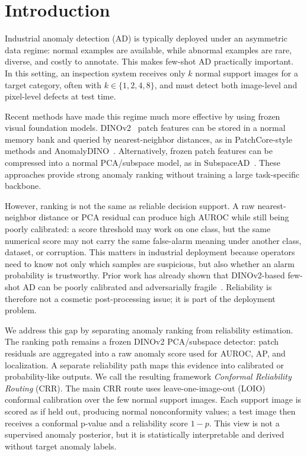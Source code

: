 \section{Introduction}\label{sec:introduction}
Industrial anomaly detection (AD) is typically deployed under an asymmetric data regime: normal examples are available, while abnormal examples are rare, diverse, and costly to annotate. This makes few-shot AD practically important. In this setting, an inspection system receives only $k$ normal support images for a target category, often with $k\in\{1,2,4,8\}$, and must detect both image-level and pixel-level defects at test time.

Recent methods have made this regime much more effective by using frozen visual foundation models. DINOv2~\cite{dinov22023} patch features can be stored in a normal memory bank and queried by nearest-neighbor distances, as in PatchCore-style methods and AnomalyDINO~\cite{patchcore2021,anomalydino2024}. Alternatively, frozen patch features can be compressed into a normal PCA/subspace model, as in SubspaceAD~\cite{subspacead2026}. These approaches provide strong anomaly ranking without training a large task-specific backbone.

However, ranking is not the same as reliable decision support. A raw nearest-neighbor distance or PCA residual can produce high AUROC while still being poorly calibrated: a score threshold may work on one class, but the same numerical score may not carry the same false-alarm meaning under another class, dataset, or corruption. This matters in industrial deployment because operators need to know not only which samples are suspicious, but also whether an alarm probability is trustworthy. Prior work has already shown that DINOv2-based few-shot AD can be poorly calibrated and adversarially fragile~\cite{khan2025calibration}. Reliability is therefore not a cosmetic post-processing issue; it is part of the deployment problem.

We address this gap by separating anomaly ranking from reliability estimation. The ranking path remains a frozen DINOv2 PCA/subspace detector: patch residuals are aggregated into a raw anomaly score used for AUROC, AP, and localization. A separate reliability path maps this evidence into calibrated or probability-like outputs. We call the resulting framework \emph{Conformal Reliability Routing} (CRR). The main CRR route uses leave-one-image-out (LOIO) conformal calibration over the few normal support images. Each support image is scored as if held out, producing normal nonconformity values; a test image then receives a conformal p-value and a reliability score $1-p$. This view is not a supervised anomaly posterior, but it is statistically interpretable and derived without target anomaly labels.

